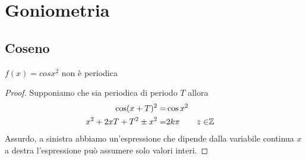 \section{Goniometria}
\subsection{Coseno}
\begin{cexmp}
	$f(x)=cosx^2$ non è periodica
\end{cexmp}
\begin{proof}
	Supponiamo che sia periodica di periodo $T$ allora
	\begin{align*}
	\cos(x+T)^2=&\cos x^2\\
	x^2+2xT+T^2\pm x^2=&2k\pi&z\in&\mathbb{Z}\\
	\end{align*}
	Assurdo, a sinistra abbiamo un'espressione che dipende dalla variabile continua $x$ a destra l'espressione può assumere solo valori interi.
\end{proof}